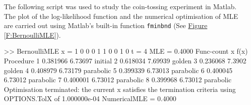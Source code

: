 
\begin{labwork}\label{LW:BernoulliMLE}
The following script was used to study the coin-tossing experiment in {\sc Matlab}.  The plot of the log-likelihood function and the numerical optimisation of MLE are carried out using {\sc Matlab}'s built-in function {\tt fminbnd} (See \hyperref[F:BernoulliMLE]{Figure \ref*{F:BernoulliMLE}}).

{}

\begin{VrbM}
>> BernoulliMLE
x =     1     0     0     0     1     1     0     0     1     0
t =     4
MLE =    0.4000
Func-count     x          f(x)         Procedure
    1       0.381966      6.73697        initial
    2       0.618034      7.69939        golden
    3       0.236068       7.3902        golden
    4       0.408979      6.73179        parabolic
    5       0.399339      6.73013        parabolic
    6       0.400045      6.73012        parabolic
    7       0.400001      6.73012        parabolic
    8       0.399968      6.73012        parabolic
Optimisation terminated:
 the current x satisfies the termination criteria using OPTIONS.TolX of 1.000000e-04 
NumericalMLE =   0.4000
\end{VrbM}
\end{labwork}

